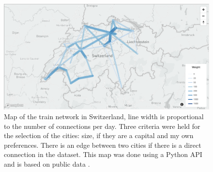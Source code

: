 \documentclass[a4paper,11pt,twoside=semi,openright]{report}
\begin{document}
\begin{figure}[!h] 
\centering
\includegraphics[width=450pt]{figures/mapCFF}
\caption{Map of the train network in Switzerland, line width is proportional to
    the number of connections per day. Three criteria were held for the
    selection of the cities: size, if they are a capital and my own
    preferences. There is an edge between two cities if there is a direct
    connection in the dataset. This map was done using a Python API
    \cite{MapBox} and is based on public data \cite{OpenData}. }
    \label{fig:CFF-map}
\end{figure}
\end{document}
